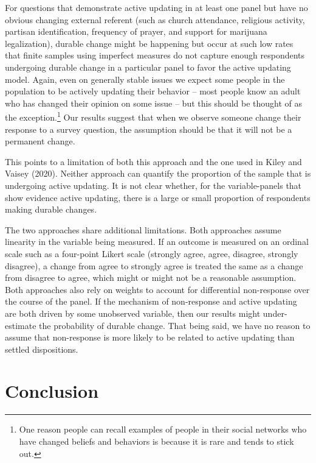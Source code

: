 \documentclass[
  11pt,
]{article}
\begin{document}
For questions that demonstrate active updating in at least one panel but have no obvious changing external referent (such as church attendance, religious activity, partisan identification, frequency of prayer, and support for marijuana legalization), durable change might be happening but occur at such low rates that finite samples using imperfect measures do not capture enough respondents undergoing durable change in a particular panel to favor the active updating model. Again, even on generally stable issues we expect some people in the population to be actively updating their behavior -- most people know an adult who has changed their opinion on some issue -- but this should be thought of as the exception.\footnote{One reason people can recall examples of people in their social networks who have changed beliefs and behaviors is because it is rare and tends to stick out.} Our results suggest that when we observe someone change their response to a survey question, the assumption should be that it will not be a permanent change.

This points to a limitation of both this approach and the one used in Kiley and Vaisey (2020). Neither approach can quantify the proportion of the sample that is undergoing active updating. It is not clear whether, for the variable-panels that show evidence active updating, there is a large or small proportion of respondents making durable changes.

The two approaches share additional limitations. Both approaches assume linearity in the variable being measured. If an outcome is measured on an ordinal scale such as a four-point Likert scale (strongly agree, agree, disagree, strongly disagree), a change from agree to strongly agree is treated the same as a change from disagree to agree, which might or might not be a reasonable assumption. Both approaches also rely on weights to account for differential non-response over the course of the panel. If the mechanism of non-response and active updating are both driven by some unobserved variable, then our results might under-estimate the probability of durable change. That being said, we have no reason to assume that non-response is more likely to be related to active updating than settled dispositions.

\hypertarget{conclusion}{%
\section{Conclusion}\label{conclusion}}
\end{document}
